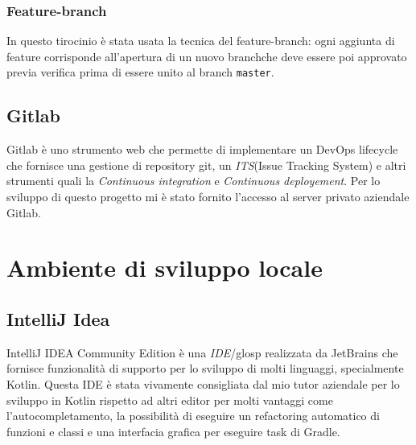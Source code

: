 \subsubsection{Feature-branch}
In questo tirocinio è stata usata la tecnica del feature-branch: ogni aggiunta di feature corrisponde all'apertura di un nuovo branch\glosp che deve essere poi approvato previa verifica prima di essere unito al branch \verb|master|.

\subsection{Gitlab}
Gitlab è uno strumento web che permette di implementare un DevOps lifecycle che fornisce una gestione di repository git, un \emph{ITS}\glosp (Issue Tracking System) e altri strumenti quali la \emph{Continuous integration} e \emph{Continuous deployement}. Per lo sviluppo di questo progetto mi è stato fornito l'accesso al server privato aziendale Gitlab.

\section{Ambiente di sviluppo locale}
\subsection{IntelliJ Idea}
IntelliJ IDEA Community Edition è una \emph{IDE}/glosp realizzata da JetBrains che fornisce funzionalità di supporto per lo sviluppo di molti linguaggi, specialmente Kotlin. Questa IDE è stata vivamente consigliata dal mio tutor aziendale per lo sviluppo in Kotlin rispetto ad altri editor per molti vantaggi come l'autocompletamento, la possibilità di eseguire un refactoring automatico di funzioni e classi e una interfacia grafica per eseguire task di Gradle.
 
